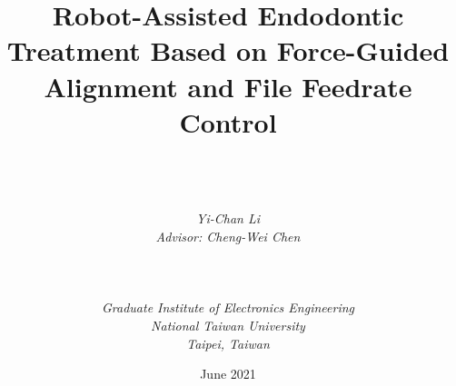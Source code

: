\documentclass[a4paper, 12pt, twoside, openany]{mythesis}
\begin{document}
\begin{titlepage}
\pagestyle{empty}
\title{\textbf{Robot-Assisted Endodontic Treatment Based on Force-Guided Alignment and File Feedrate Control}}
\author{ \\  \\ \\
{\it Yi-Chan Li}\\
{\it Advisor: Cheng-Wei Chen} \\ \\ \\ \\ 
{\it Graduate Institute of Electronics Engineering}\\
{\it National Taiwan University} \\
{\it Taipei, Taiwan}\\ }
{\date{June 2021}}
\maketitle
\end{titlepage}


\frontmatter %

\tableofcontents
\listoffigures
\listoftables


\titlespacing*{\chapter}{0pt}{-40pt}{35pt}

\mainmatter %












\end{document}
